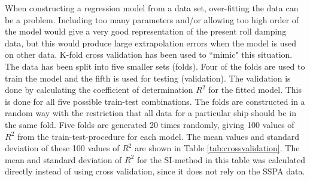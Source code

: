 \noindent When constructing a regression model from a data set, over-fitting the data can be a problem. Including too many parameters and/or allowing too high order of the model would give a very good representation of the present roll damping data, but this would produce large extrapolation errors when the model is used on other data. K-fold cross validation has been used to ``mimic" this situation. The data has been split into five smaller sets (folds). Four of the folds are used to train the model and the fifth is used for testing (validation). The validation is done by calculating the coefficient of determination $R^2$ for the fitted model. This is done for all five possible train-test combinations. 
The folds are constructed in a random way with the restriction that all data for a particular ship should be in the same fold. Five folds are generated 20 times randomly, giving 100 values of $R^2$ from the train-test-procedure for each model. The mean values and standard deviation of these 100 values of $R^2$ are shown in Table \ref{tab:crossvalidation}. The mean and standard deviation of $R^2$ for the SI-method in this table was calculated directly instead of using cross validation, since it does not rely on the SSPA data.

